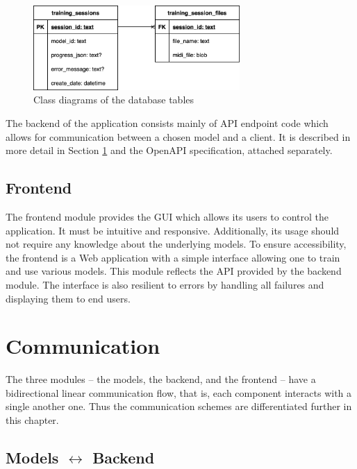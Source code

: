 \documentclass[a4paper, 11pt, twoside]{report}
\theoremstyle{definition}
\begin{document}
\begin{figure}
    \centering
    \includegraphics[width=0.7\textwidth]{database_class.png}
    \caption{Class diagrams of the database tables}
    \label{fig:db_class_diagram}
\end{figure}

The backend of the application consists mainly of API endpoint code which allows for communication between a chosen model and a client. It is described in more detail in Section \ref{sec:communication} and the OpenAPI specification, attached separately. \par

\subsection{Frontend}

The frontend module provides the GUI which allows its users to control the application. It must be intuitive and responsive. Additionally, its usage should not require any knowledge about the underlying models. To ensure accessibility, the frontend is a Web application with a simple interface allowing one to train and use various models. This module reflects the API provided by the backend module. The interface is also resilient to errors by handling all failures and displaying them to end users. \par


\section{Communication} \label{sec:communication}

The three modules -- the models, the backend, and the frontend -- have a bidirectional linear communication flow, that is, each component interacts with a single another one. Thus the communication schemes are differentiated further in this chapter. \par

\subsection{Models \texorpdfstring{$\leftrightarrow$}{<->} Backend}
\end{document}
